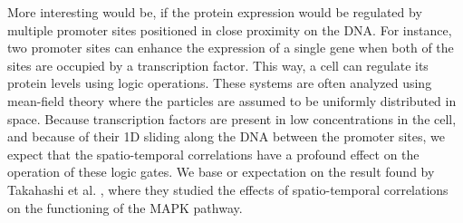 More interesting would be, if the protein expression would be regulated by multiple promoter sites positioned in close proximity on the DNA. For instance, two promoter sites can enhance the expression of a single gene when both of the sites are occupied by a transcription factor. This way, a cell can regulate its protein levels using logic operations. These systems are often analyzed using mean-field theory where the particles are assumed to be uniformly distributed in space. Because transcription factors are present in low concentrations in the cell, and because of their 1D sliding along the DNA between the promoter sites, we expect that the spatio-temporal correlations have a profound effect on the operation of these logic gates. We base or expectation on the result found by Takahashi et al.  \cite{Takahashi2010}, where they studied the effects of spatio-temporal correlations on the functioning of the MAPK pathway.